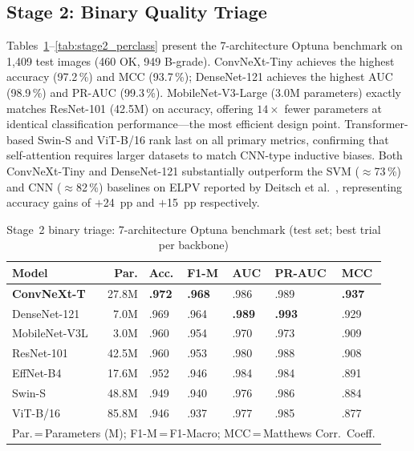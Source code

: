 \documentclass[conference]{IEEEtran}
\begin{document}
\subsection{Stage 2: Binary Quality Triage}

Tables~\ref{tab:stage2_results}--\ref{tab:stage2_perclass} present the 7-architecture Optuna benchmark on 1{,}409 test images (460 OK, 949 B-grade). ConvNeXt-Tiny achieves the highest accuracy (97.2\,\%) and MCC (93.7\,\%); DenseNet-121 achieves the highest AUC (98.9\,\%) and PR-AUC (99.3\,\%). MobileNet-V3-Large (3.0M parameters) exactly matches ResNet-101 (42.5M) on accuracy, offering $14\times$ fewer parameters at identical classification performance---the most efficient design point. Transformer-based Swin-S and ViT-B/16 rank last on all primary metrics, confirming that self-attention requires larger datasets to match CNN-type inductive biases. Both ConvNeXt-Tiny and DenseNet-121 substantially outperform the SVM ($\approx$73\,\%) and CNN ($\approx$82\,\%) baselines on ELPV reported by Deitsch et al.~\cite{deitsch2019}, representing accuracy gains of $+$24~pp and $+$15~pp respectively.

\begin{table}[t]
  \caption{Stage~2 binary triage: 7-architecture Optuna benchmark (test set; best trial per backbone)}
  \label{tab:stage2_results}
  \begin{center}
  \renewcommand{\arraystretch}{1.05}\small
  \setlength{\tabcolsep}{3.0pt}
  \begin{tabular}{p{1.75cm}rp{0.6cm}p{0.65cm}p{0.65cm}p{0.72cm}p{0.65cm}}
    \toprule
    \textbf{Model} & \textbf{Par.} & \textbf{Acc.} & \textbf{F1-M} & \textbf{AUC} & \textbf{PR-AUC} & \textbf{MCC}\\
    \midrule
    \textbf{ConvNeXt-T} & 27.8M & \textbf{.972} & \textbf{.968} & .986 & .989 & \textbf{.937}\\
    DenseNet-121        &  7.0M & .969           & .964          & \textbf{.989} & \textbf{.993} & .929\\
    MobileNet-V3L       &  3.0M & .960           & .954          & .970 & .973 & .909\\
    ResNet-101          & 42.5M & .960           & .953          & .980 & .988 & .908\\
    EffNet-B4           & 17.6M & .952           & .946          & .984 & .984 & .891\\
    Swin-S              & 48.8M & .949           & .940          & .976 & .986 & .884\\
    ViT-B/16            & 85.8M & .946           & .937          & .977 & .985 & .877\\
    \bottomrule
    \multicolumn{7}{l}{\footnotesize Par.\,=\,Parameters (M); F1-M\,=\,F1-Macro; MCC\,=\,Matthews Corr.\ Coeff.}
  \end{tabular}
  \end{center}
\end{table}
\end{document}
